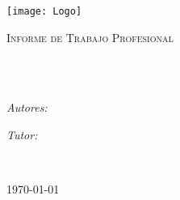 \documentclass[
11pt, %
oneside, %
spanish, %
singlespacing, %
parskip, %
headsepline, %
chapterinoneline, %
]{MastersDoctoralThesis} %
\author{
Fabrizio \textsc{Graffe} 93158\\
Agustín \textsc{Rojas}  91462
} %
\begin{document}
\frontmatter %

\pagestyle{plain} %


\begin{titlepage}
\begin{center}

\vspace*{.06\textheight}
{\scshape\LARGE \univname\par}
\vspace{0.7cm} %

\texttt{[image: Logo]} %

\vspace{0.7cm} %


\textsc{\Large Informe de Trabajo Profesional}\\[0.5cm] %

\HRule \\[0.4cm] %
{\huge \bfseries \ttitle\par}\vspace{0.4cm} %
\HRule \\[1.5cm] %
 
\begin{minipage}[t]{0.4\textwidth}
\begin{flushleft} \large
\emph{Autores:}\\
{\authorname} %
\end{flushleft}
\end{minipage}
\begin{minipage}[t]{0.4\textwidth}
\begin{flushright} \large
\emph{Tutor:} \\
{\supname} %
\end{flushright}
\end{minipage}\\[3cm]

 
\vfill

{\large \today}\\[4cm] %

 
\vfill
\end{center}
\end{titlepage}
\end{document}
